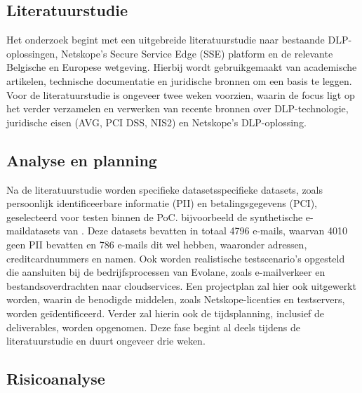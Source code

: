 
\subsection{Literatuurstudie}%

Het onderzoek begint met een uitgebreide literatuurstudie naar bestaande DLP-oplossingen, Netskope's Secure Service Edge (SSE) platform en de relevante Belgische en Europese wetgeving. 
Hierbij wordt gebruikgemaakt van academische artikelen, technische documentatie en juridische bronnen om een basis te leggen. 
Voor de literatuurstudie is ongeveer twee weken voorzien, waarin de focus ligt op het verder verzamelen en verwerken van recente bronnen
over DLP-technologie, juridische eisen (AVG, PCI DSS, NIS2) en Netskope's DLP-oplossing.

\subsection{Analyse en planning}%

Na de literatuurstudie worden specifieke datasetsspecifieke datasets, zoals persoonlijk identificeerbare informatie (PII) 
en betalingsgegevens (PCI), geselecteerd voor testen binnen de PoC. 
bijvoorbeeld de synthetische e-maildatasets van \textcite{Whelan2014}.
Deze datasets bevatten in totaal 4796 e-mails, waarvan 4010 geen PII bevatten en 786 e-mails dit wel hebben, 
waaronder adressen, creditcardnummers en namen. 
Ook worden realistische testscenario's opgesteld die aansluiten bij de bedrijfsprocessen van Evolane, zoals e-mailverkeer en bestandsoverdrachten 
naar cloudservices. Een projectplan zal hier ook uitgewerkt worden, waarin de benodigde middelen, zoals Netskope-licenties en testservers, worden 
geïdentificeerd. Verder zal hierin ook de tijdsplanning, inclusief de deliverables, worden opgenomen.
Deze fase begint al deels tijdens de literatuurstudie en duurt ongeveer drie weken.

\subsection{Risicoanalyse}%

